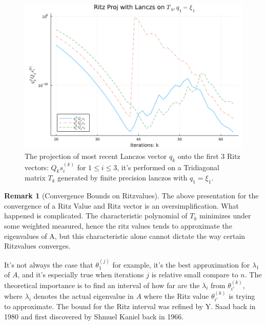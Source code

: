 \documentclass[]{article}
\theoremstyle{definition}
\newtheorem{remark}{Remark}[subsection]  %
\begin{document}
            \begin{figure}[H]
                \centering 
                \includegraphics[width=14cm]{ritz_proj_tridiagonal.png}
                \caption{The projection of most recent Lanczos vector $q_k$ onto the first 3 Ritz vectors: $Q_ks_i^{(k)}$ for $1\le i \le 3$, it's performed on a Tridiagonal matrix $T_k$ generated by finite precision lanczos with $q_1 = \xi_1$. }
            \end{figure}\label{fig:6}
            \begin{remark}[Convergence Bounds on Ritzvalues]
                The above presentation for the convergence of a Ritz Value and Ritz vector is an oversimplification. What happened is complicated. The characteristic polynomial of $T_k$ minimizes under some weighted measured, hence the ritz values tends to approximate the eigenvalues of A, but this characteristic alone cannot dictate the way certain Ritzvalues converges.
                \par
                It's not always the case that $\theta_1^{(j)}$ for example, it's the best approximation for $\lambda_1$ of $A$, and it's especially true when iterations $j$ is relative small compare to $n$. The theoretical importance is to find an interval of how far are the $\lambda_i$ from $\theta_{i'}^{(k)}$, where $\lambda_i$ denotes the actual eigenvalue in $A$ where the Ritz value $\theta_{i'}^{(k)}$ is trying to approximate. The bound for the Ritz interval was refined by Y. Saad back in 1980\cite{paper:saad_ritz_convergence} and first discovered by Shmuel Kaniel back in 1966\cite{paper:kaniel1966}. 
            \end{remark}
\end{document}
